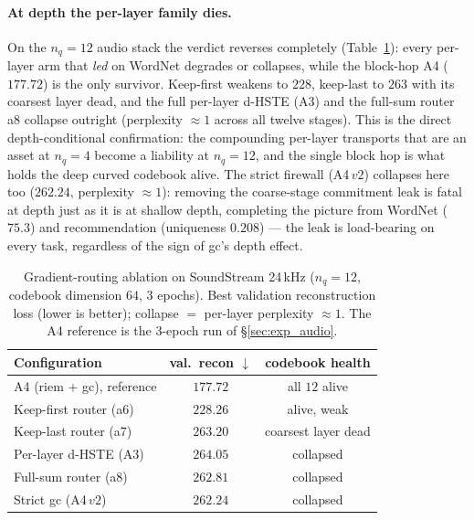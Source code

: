 \documentclass[12pt]{report}
\begin{document}
\paragraph{At depth the per-layer family dies.} On the $n_q=12$ audio stack the verdict reverses completely (Table~\ref{tab:abl_audio}): every per-layer arm that \emph{led} on WordNet degrades or collapses, while the block-hop A4 ($177.72$) is the only survivor. Keep-first weakens to $228$, keep-last to $263$ with its coarsest layer dead, and the full per-layer d-HSTE (A3) and the full-sum router a8 collapse outright (perplexity $\approx 1$ across all twelve stages). This is the direct depth-conditional confirmation: the compounding per-layer transports that are an asset at $n_q=4$ become a liability at $n_q=12$, and the single block hop is what holds the deep curved codebook alive. The strict firewall (A4\,$v2$) collapses here too ($262.24$, perplexity $\approx 1$): removing the coarse-stage commitment leak is fatal at depth just as it is at shallow depth, completing the picture from WordNet ($75.3$) and recommendation (uniqueness $0.208$) --- the leak is load-bearing on every task, regardless of the sign of gc's depth effect.

\begin{table}[h]
\centering
\caption{Gradient-routing ablation on SoundStream 24\,kHz ($n_q=12$, codebook dimension $64$, $3$ epochs). Best validation reconstruction loss (lower is better); collapse $=$ per-layer perplexity $\approx 1$. The A4 reference is the $3$-epoch run of \S\ref{sec:exp_audio}.}
\label{tab:abl_audio}
\begin{tabular}{lcc}
\hline
Configuration & val.\ recon $\downarrow$ & codebook health \\
\hline
A4 (riem + gc), reference & $\mathbf{177.72}$ & all $12$ alive \\
Keep-first router (a6) & $228.26$ & alive, weak \\
Keep-last router (a7) & $263.20$ & coarsest layer dead \\
Per-layer d-HSTE (A3) & $264.05$ & collapsed \\
Full-sum router (a8) & $262.81$ & collapsed \\
Strict gc (A4\,$v2$) & $262.24$ & collapsed \\
\hline
\end{tabular}
\end{table}
\end{document}
